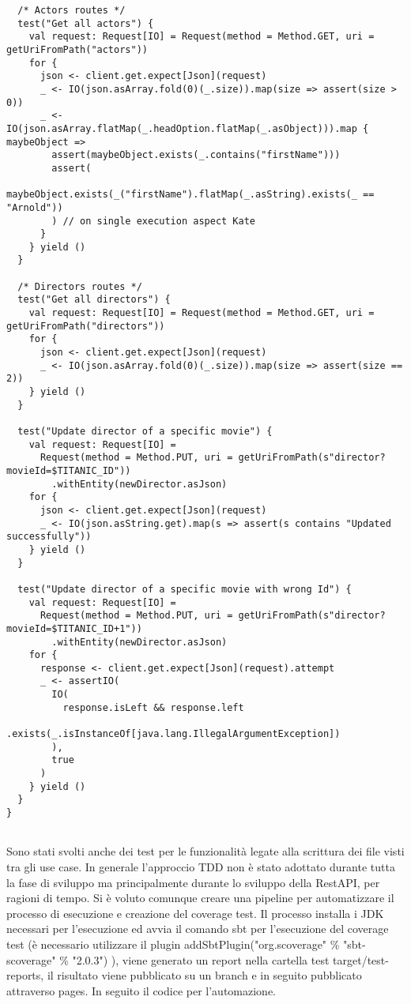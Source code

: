 \begin{verbatim}
  /* Actors routes */
  test("Get all actors") {
    val request: Request[IO] = Request(method = Method.GET, uri = getUriFromPath("actors"))
    for {
      json <- client.get.expect[Json](request)
      _ <- IO(json.asArray.fold(0)(_.size)).map(size => assert(size > 0))
      _ <- IO(json.asArray.flatMap(_.headOption.flatMap(_.asObject))).map { maybeObject =>
        assert(maybeObject.exists(_.contains("firstName")))
        assert(
          maybeObject.exists(_("firstName").flatMap(_.asString).exists(_ == "Arnold"))
        ) // on single execution aspect Kate
      }
    } yield ()
  }

  /* Directors routes */
  test("Get all directors") {
    val request: Request[IO] = Request(method = Method.GET, uri = getUriFromPath("directors"))
    for {
      json <- client.get.expect[Json](request)
      _ <- IO(json.asArray.fold(0)(_.size)).map(size => assert(size == 2))
    } yield ()
  }

  test("Update director of a specific movie") {
    val request: Request[IO] =
      Request(method = Method.PUT, uri = getUriFromPath(s"director?movieId=$TITANIC_ID"))
        .withEntity(newDirector.asJson)
    for {
      json <- client.get.expect[Json](request)
      _ <- IO(json.asString.get).map(s => assert(s contains "Updated successfully"))
    } yield ()
  }

  test("Update director of a specific movie with wrong Id") {
    val request: Request[IO] =
      Request(method = Method.PUT, uri = getUriFromPath(s"director?movieId=$TITANIC_ID+1"))
        .withEntity(newDirector.asJson)
    for {
      response <- client.get.expect[Json](request).attempt
      _ <- assertIO(
        IO(
          response.isLeft && response.left
            .exists(_.isInstanceOf[java.lang.IllegalArgumentException])
        ),
        true
      )
    } yield ()
  }
}
    
\end{verbatim}

\noindent Sono stati svolti anche dei test per le funzionalità legate alla scrittura dei file visti tra gli use case. In generale l'approccio TDD non è stato adottato durante tutta la fase di sviluppo ma principalmente durante lo sviluppo della RestAPI, per ragioni di tempo. Si è voluto comunque creare una pipeline per automatizzare il processo di esecuzione e creazione del coverage test. Il processo installa i JDK necessari per l'esecuzione ed avvia il comando sbt per l'esecuzione del coverage test (è necessario utilizzare il plugin addSbtPlugin("org.scoverage" \% "sbt-scoverage" \% "2.0.3") ), viene generato un report nella cartella test target/test-reports, il risultato viene pubblicato su un branch e in seguito pubblicato attraverso pages. In seguito il codice per l'automazione.

